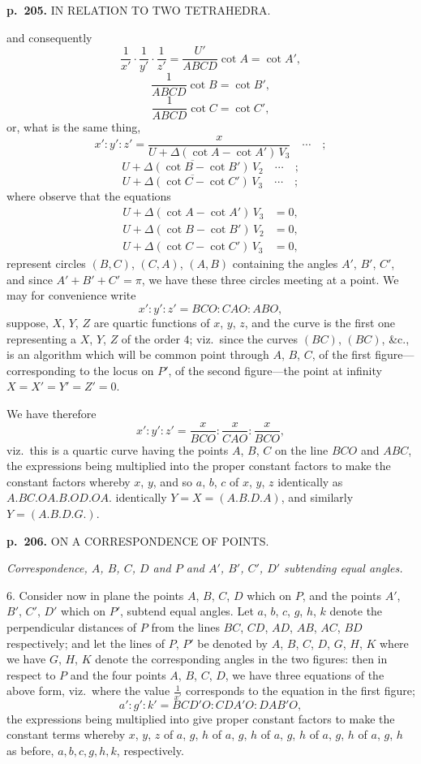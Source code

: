 \documentclass[11pt,a4paper]{article}
\begin{document}
\clearpage

\noindent
\textbf{p.~205.}  IN RELATION TO TWO TETRAHEDRA.

and consequently
\[
\frac{1}{x'} \cdot \frac{1}{y'} \cdot \frac{1}{z'} = \frac{U'}{ABCD}\cot A = \cot A',
\]
\[
\frac{1}{ABCD}\cot B = \cot B',
\]
\[
\frac{1}{ABCD}\cot C = \cot C',
\]
or, what is the same thing,
\[
x' : y' : z' = \frac{x}{U + \Delta(\cot A - \cot A')\,V_3} \quad \cdots \quad ;
\]
\[
\overline{U + \Delta(\cot B - \cot B')\,V_2} \quad \cdots \quad ;
\]
\[
\overline{U + \Delta(\cot C - \cot C')\,V_3} \quad \cdots \quad ;
\]
where observe that the equations
\begin{align*}
U + \Delta(\cot A - \cot A')\,V_3 &= 0, \\
U + \Delta(\cot B - \cot B')\,V_2 &= 0, \\
U + \Delta(\cot C - \cot C')\,V_3 &= 0,
\end{align*}
represent circles $(B, C)$, $(C, A)$, $(A, B)$ containing the angles $A'$, $B'$, $C'$, and since $A' + B' + C' = \pi$, we have these three circles meeting at a point.  We may for convenience write
\[
x' : y' : z' = BCO : CAO : ABO,
\]
suppose, $X$, $Y$, $Z$ are quartic functions of $x$, $y$, $z$, and the curve is the first one representing a $X$, $Y$, $Z$ of the order $4$; viz.\ since the curves $(BC)$, $(BC)$, \&c., is an algorithm which will be common point through $A$, $B$, $C$, of the first figure---corresponding to the locus on $P'$, of the second figure---the point at infinity $X = X' = Y' = Z' = 0$.

We have therefore
\[
x' : y' : z' = \frac{x}{BCO} : \frac{x}{CAO} : \frac{x}{BCO},
\]
viz.\ this is a quartic curve having the points $A$, $B$, $C$ on the line $BCO$ and $ABC$, the expressions being multiplied into the proper constant factors to make the constant factors whereby $x$, $y$, and so $a$, $b$, $c$ of $x$, $y$, $z$ identically as $A.BC.OA.B.OD.OA.$ identically $Y = X = (A.B.D.A)$, and similarly $Y = (A.B.D.G.)$.

\clearpage

\noindent
\textbf{p.~206.}  ON A CORRESPONDENCE OF POINTS.

\textit{Correspondence, $A$, $B$, $C$, $D$ and $P$ and $A'$, $B'$, $C'$, $D'$ subtending equal angles.}

6. Consider now in plane the points $A$, $B$, $C$, $D$ which on $P$, and the points $A'$, $B'$, $C'$, $D'$ which on $P'$, subtend equal angles. Let $a$, $b$, $c$, $g$, $h$, $k$ denote the perpendicular distances of $P$ from the lines $BC$, $CD$, $AD$, $AB$, $AC$, $BD$ respectively; and let the lines of $P$, $P'$ be denoted by $A$, $B$, $C$, $D$, $G$, $H$, $K$ where we have $G$, $H$, $K$ denote the corresponding angles in the two figures: then in respect to $P$ and the four points $A$, $B$, $C$, $D$, we have three equations of the above form, viz.\ where the value $\frac{1}{x'}$ corresponds to the equation in the first figure;
\[
a' : g' : k' = BCD'O : CDA'O : DAB'O,
\]
the expressions being multiplied into give proper constant factors to make the constant terms whereby $x$, $y$, $z$ of $a$, $g$, $h$ of $a$, $g$, $h$ of $a$, $g$, $h$ of $a$, $g$, $h$ of $a$, $g$, $h$ as before, $a, b, c, g, h, k$, respectively.
\end{document}
